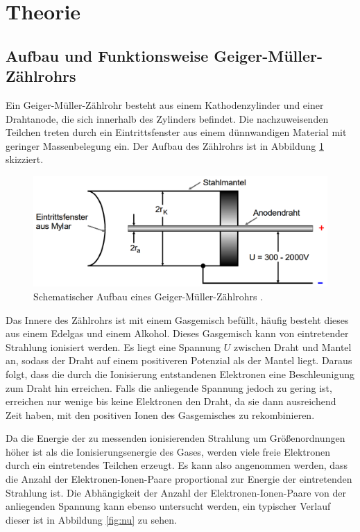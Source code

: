 \section{Theorie}
\label{sec:Theorie}
\subsection{Aufbau und Funktionsweise Geiger-Müller-Zählrohrs}
\label{subsec:theorie1}
Ein Geiger-Müller-Zählrohr besteht aus einem Kathodenzylinder und einer Drahtanode, die sich
innerhalb des Zylinders befindet. Die nachzuweisenden Teilchen treten durch ein Eintrittsfenster
aus einem dünnwandigen Material mit geringer Massenbelegung ein.
Der Aufbau des Zählrohrs ist in Abbildung \ref{fig:zaehlrohrskizze}
skizziert.

\begin{figure}
  \centering
  \includegraphics[width=\textwidth]{data/zaehlrohrskizze.png}
  \caption{Schematischer Aufbau eines Geiger-Müller-Zählrohrs \cite{Versuchsanleitung}.}
  \label{fig:zaehlrohrskizze}
\end{figure}

Das Innere des Zählrohrs ist mit einem Gasgemisch befüllt, häufig besteht dieses aus einem Edelgas und einem Alkohol.
Dieses Gasgemisch kann von eintretender Strahlung ionisiert werden.
Es liegt eine Spannung $U$ zwischen Draht und Mantel an, sodass der Draht auf einem positiveren Potenzial als
der Mantel liegt. Daraus folgt, dass die durch die Ionisierung entstandenen Elektronen
eine Beschleunigung zum Draht hin erreichen. Falls die anliegende Spannung jedoch
zu gering ist, erreichen nur wenige bis keine Elektronen den Draht, da sie dann ausreichend
Zeit haben, mit den positiven Ionen des Gasgemisches zu rekombinieren.

Da die Energie der zu messenden ionisierenden Strahlung um Größenordnungen höher
ist als die Ionisierungsenergie des Gases, werden viele freie Elektronen durch ein eintretendes
Teilchen erzeugt. Es kann also angenommen werden, dass die Anzahl der Elektronen-Ionen-Paare
proportional zur Energie der eintretenden Strahlung ist. Die Abhängigkeit der Anzahl der Elektronen-Ionen-Paare
von der anliegenden Spannung kann ebenso untersucht werden, ein typischer
Verlauf dieser ist in Abbildung \ref{fig:nu} zu sehen.

